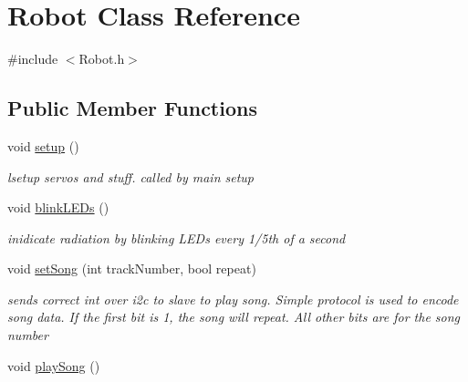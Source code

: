 \hypertarget{classRobot}{\section{Robot Class Reference}
\label{classRobot}
}


{\ttfamily \#include $<$Robot.\-h$>$}

\subsection*{Public Member Functions}
\begin{DoxyCompactItemize}
\item 
\hypertarget{classRobot_a1fc37e3c329d59795f6adf44199d4df9}{void \hyperlink{classRobot_a1fc37e3c329d59795f6adf44199d4df9}{setup} ()}\label{classRobot_a1fc37e3c329d59795f6adf44199d4df9}

\begin{DoxyCompactList}\small\item\em lsetup servos and stuff. called by main setup \end{DoxyCompactList}\item 
\hypertarget{classRobot_a4215f7e880311c2118f387df75effaf2}{void \hyperlink{classRobot_a4215f7e880311c2118f387df75effaf2}{blink\-L\-E\-Ds} ()}\label{classRobot_a4215f7e880311c2118f387df75effaf2}

\begin{DoxyCompactList}\small\item\em inidicate radiation by blinking L\-E\-Ds every 1/5th of a second \end{DoxyCompactList}\item 
\hypertarget{classRobot_a87e94e8db5092976d1125c674cf2b519}{void \hyperlink{classRobot_a87e94e8db5092976d1125c674cf2b519}{set\-Song} (int track\-Number, bool repeat)}\label{classRobot_a87e94e8db5092976d1125c674cf2b519}

\begin{DoxyCompactList}\small\item\em sends correct int over i2c to slave to play song. Simple protocol is used to encode song data. If the first bit is 1, the song will repeat. All other bits are for the song number \end{DoxyCompactList}\item 
\hypertarget{classRobot_ad86dbbb2ad0d065f3e4c30fd4b742e1c}{void \hyperlink{classRobot_ad86dbbb2ad0d065f3e4c30fd4b742e1c}{play\-Song} ()}\label{classRobot_ad86dbbb2ad0d065f3e4c30fd4b742e1c}


\end{DoxyCompactItemize}
